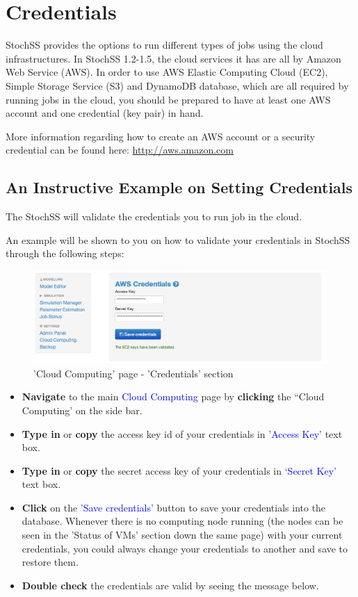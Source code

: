 \documentclass[12pt,notitlepage,nofootinbib]{revtex4}
\begin{document}
\newpage

\section{Credentials}
StochSS provides the options to run different types of jobs using the cloud infrastructures. In StochSS 1.2-1.5, the cloud services it has are all by Amazon Web Service (AWS). In order to use AWS Elastic Computing Cloud (EC2), Simple Storage Service (S3) and DynamoDB database, which are all required by running jobs in the cloud, you should be prepared to have at least one AWS account and one credential (key pair) in hand. 

More information regarding how to create an AWS account or a security credential can be found here: \url{http://aws.amazon.com}

\subsection{An Instructive Example on Setting Credentials}
The StochSS will validate the credentials you to run job in the cloud. 

An example will be shown to you on how to validate your credentials in StochSS through the following steps:

\begin{figure}[!ht]
\centering
\includegraphics[scale=0.45]{T6_fig_credentials.png}
\caption{'Cloud Computing' page - 'Credentials' section}
\label{fig:2}
\end{figure}

\begin{itemize}
\item \textbf{Navigate} to the main \textcolor{blue}{Cloud Computing} page by \textbf{clicking} the ``Cloud Computing' on the side bar.
\item \textbf{Type in} or \textbf{copy} the access key id of your credentials in \textcolor{blue}{'Access Key'} text box.
 \item \textbf{Type in} or \textbf{copy} the secret access key of your credentials in \textcolor{blue}{`Secret Key'} text box. 
 \item \textbf{Click} on the \textcolor{blue}{'Save credentials'} button to save your credentials into the database. Whenever there is no computing node running (the nodes can be seen in the 'Status of VMs' section down the same page) with your current credentials, you could always change your credentials to another and save to restore them.
 \item \textbf{Double check} the credentials are valid by seeing the message below.

\end{itemize}
\end{document}
